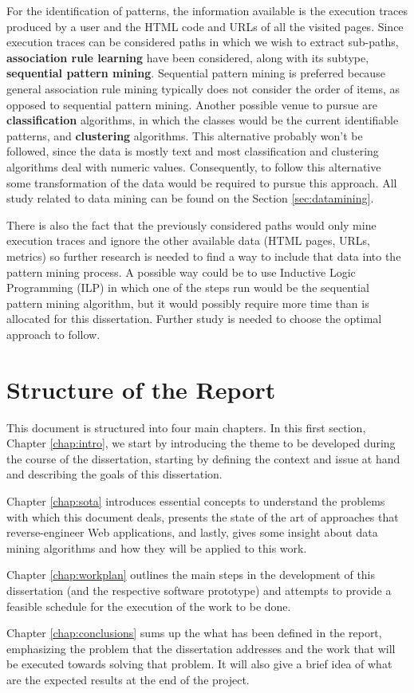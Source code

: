 For the identification of patterns, the information available is the execution traces produced by a user and the HTML code and URLs of all the visited pages. Since execution traces can be considered paths in which we wish to extract sub-paths, \textbf{association rule learning} have been considered, along with its subtype, \textbf{sequential pattern mining}. Sequential pattern mining is preferred because general association rule mining typically does not consider the order of items, as opposed to sequential pattern mining. Another possible venue to pursue are \textbf{classification} algorithms, in which the classes would be the current identifiable patterns, and \textbf{clustering} algorithms. This alternative probably won't be followed, since the data is mostly text and most classification and clustering algorithms deal with numeric values. Consequently, to follow this alternative some transformation of the data would be required to pursue this approach. All study related to data mining can be found on the Section \ref{sec:datamining}. 

There is also the fact that the previously considered paths would only mine execution traces and ignore the other available data (HTML pages, URLs, metrics) so further research is needed to find a way to include that data into the pattern mining process. A possible way could be to use Inductive Logic Programming (ILP) in which one of the steps run would be the sequential pattern mining algorithm, but it would possibly require more time than is allocated for this dissertation. Further study is needed to choose the optimal approach to follow.

\section{Structure of the Report} \label{sec:outline}

This document is structured into four main chapters. In this first section, Chapter \ref{chap:intro}, we start by introducing the theme to be developed during the course of the dissertation, starting by defining the context and issue at hand and describing the goals of this dissertation.

Chapter \ref{chap:sota} introduces essential concepts to understand the problems with which this document deals, presents the state of the art of approaches that reverse-engineer Web applications, and lastly, gives some insight about data mining algorithms and how they will be applied to this work.

Chapter \ref{chap:workplan} outlines the main steps in the development of this dissertation (and the respective software prototype) and attempts to provide a feasible schedule for the execution of the work to be done.

Chapter \ref{chap:conclusions} sums up the what has been defined in the report, emphasizing the problem that the dissertation addresses and the work that will be executed towards solving that problem. It will also give a brief idea of what are the expected results at the end of the project.